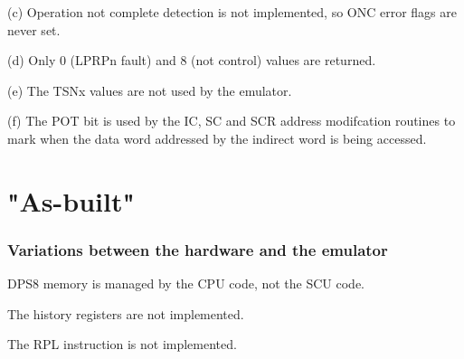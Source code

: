 \documentclass[notitlepage]{report}
\begin{document}
(c) Operation not complete detection is not implemented, so ONC error flags are never set.

(d) Only 0 (LPRPn fault) and 8 (not control) values are returned.

(e) The TSNx values are not used by the emulator.

(f) The POT bit is used by the IC, SC and SCR address modifcation routines to mark when the
data word addressed by the indirect word is being accessed.


\part{"As-built"}

\section{Variations between the hardware and the emulator}

DPS8 memory is managed by the CPU code, not the SCU code.

The history registers are not implemented.

The RPL instruction is not implemented.
\end{document}

